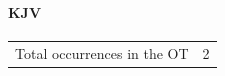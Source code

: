 		\paragraph{KJV}
			\label{COMPREHEND-OT-KJV}
	
			\begin{tabular}{ll}
				Total occurrences in the OT & 2
			\end{tabular}
			
			\begin{compactdesc}
				\item[{\hyperref[JOB-37-5]{Job 37:5}}]
				\item[{\hyperref[ISAIAH-40-12]{Isaiah 40:12}}]
			\end{compactdesc}
			
		
			
				
			
